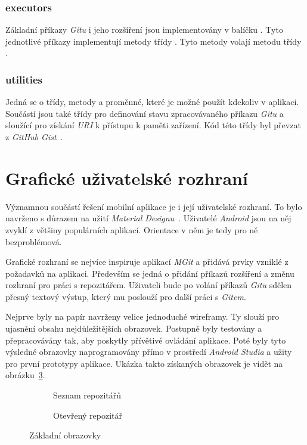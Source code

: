     \subsubsection{executors}
    Základní příkazy \emph{Gitu} i jeho rozšíření jsou implementovány v balíčku . Tyto jednotlivé příkazy implementují metody třídy . Tyto metody volají metodu  třídy .

    \subsubsection{utilities}
    Jedná se o třídy, metody a proměnné, které je možné použít kdekoliv v aplikaci. Součástí jsou také třídy  pro definování stavu zpracovávaného příkazu \emph{Gitu} a  sloužící pro získání \emph{URI} k přístupu k paměti zařízení. Kód této třídy byl převzat z \emph{GitHub Gist}~.

\newpage
\section{Grafické uživatelské rozhraní}
Významnou součástí řešení mobilní aplikace je i její uživatelské rozhraní. To bylo navrženo s důrazem na užití \emph{Material Designu}~. Uživatelé \emph{Android} jsou na něj zvyklí z většiny populárních aplikací. Orientace v něm je tedy pro ně bezproblémová.

Grafické rozhraní se nejvíce inspiruje aplikací \emph{MGit} a přidává prvky vzniklé z požadavků na aplikaci. Především se jedná o přidání příkazů rozšíření a změnu rozhraní pro práci s repozitářem. Uživateli bude po volání příkazů \emph{Gitu} sdělen přesný textový výstup, který mu poslouží pro další práci s \emph{Gitem}. 

Nejprve byly na papír navrženy velice jednoduché wireframy. Ty slouží pro ujasnění obsahu nejdůležitějších obrazovek. Postupně byly testovány a přepracovávány tak, aby poskytly přívětivé ovládání aplikace. Poté byly tyto výsledné obrazovky naprogramovány přímo v prostředí \emph{Android Studia} a užity pro první prototypy aplikace. Ukázka takto získaných obrazovek je vidět na obrázku~\ref{fig:obrazovky}.

\begin{figure}[ht]
    \vspace{0.5cm}
    \centering
    \begin{subfigure}{.4\textwidth}        
        \centering
        \caption{Seznam repozitářů}\label{fig:orig}
        \label{fig:repolist_frame}
    \end{subfigure}
    \begin{subfigure}{.4\textwidth}
        \centering
        \caption{Otevřený repozitář}
        \label{fig:result_frame}
    \end{subfigure}
\caption{Základní obrazovky}%
\label{fig:obrazovky}%
\end{figure}

